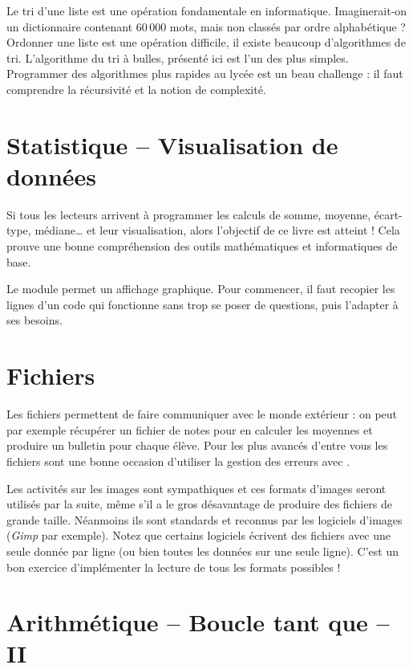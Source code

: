 \documentclass[11pt,class=report,crop=false]{standalone}
\begin{document}
Le tri d'une liste est une opération fondamentale en informatique. Imaginerait-on un dictionnaire contenant $60\,000$ mots, mais non classés par ordre alphabétique ?
Ordonner une liste est une opération difficile, il existe beaucoup d'algorithmes de tri. L'algorithme du tri à bulles, présenté ici est l'un des plus simples. Programmer des algorithmes plus rapides au lycée est un beau challenge : il faut comprendre la récursivité et la notion de complexité.


\section{Statistique -- Visualisation de données}

Si tous les lecteurs arrivent à programmer les calculs de somme, moyenne, écart-type, médiane\ldots{} et leur visualisation, alors l'objectif de ce livre est atteint ! Cela prouve une bonne compréhension des outils mathématiques et informatiques de base.

Le module  permet un affichage graphique. Pour commencer, il faut recopier les lignes d'un code qui fonctionne sans trop se poser de questions, puis l'adapter à ses besoins.


\section{Fichiers}

Les fichiers permettent de faire communiquer \Python{} avec le monde extérieur : on peut par exemple récupérer un fichier de notes pour en calculer les moyennes et produire un bulletin pour chaque élève.
Pour les plus avancés d'entre vous les fichiers sont une bonne occasion d'utiliser la gestion des erreurs avec .

Les activités sur les images sont sympathiques et ces formats d'images seront utilisés par la suite, même s'il a le gros désavantage de produire des fichiers de grande taille. Néanmoins ils sont standards et reconnus par les logiciels d'images (\emph{Gimp} par exemple). Notez que certains logiciels écrivent des fichiers avec une seule donnée par ligne (ou bien toutes les données sur une seule ligne). C'est un bon exercice d'implémenter la lecture de tous les formats possibles !


\section{Arithmétique -- Boucle tant que -- II}
\end{document}
